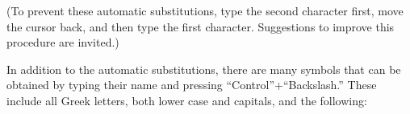 \documentclass[11pt]{report}
\begin{document}
\noindent (To prevent these automatic substitutions, type the second character
first, move the cursor back, and then type the first
character. Suggestions to improve this procedure are invited.)

In addition to the automatic substitutions, there are many symbols
that can be obtained by typing their name and pressing
``Control''+``Backslash.'' These include all Greek letters, both
lower case and capitals, and the following:

\end{document}
